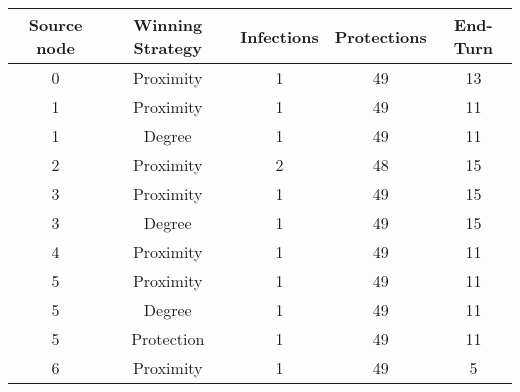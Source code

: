 \documentclass[results.tex]{subfiles}
\begin{document}
    \begin{center}
        \begin{tabular}{| c || c | c | c | c |}
            \hline
            {\bfseries Source node} & {\bfseries Winning Strategy} & {\bfseries Infections} & {\bfseries Protections}
            & {\bfseries End-Turn}
            \\  %
            \hline\hline
            0                       & Proximity                    & 1                      & 49                      & 13                   \\
            \hline
            1                       & Proximity                    & 1                      & 49                      & 11                   \\
            \hline
            1                       & Degree                       & 1                      & 49                      & 11                   \\
            \hline
            2                       & Proximity                    & 2                      & 48                      & 15                   \\
            \hline
            3                       & Proximity                    & 1                      & 49                      & 15                   \\
            \hline
            3                       & Degree                       & 1                      & 49                      & 15                   \\
            \hline
            4                       & Proximity                    & 1                      & 49                      & 11                   \\
            \hline
            5                       & Proximity                    & 1                      & 49                      & 11                   \\
            \hline
            5                       & Degree                       & 1                      & 49                      & 11                   \\
            \hline
            5                       & Protection                   & 1                      & 49                      & 11                   \\
            \hline
            6                       & Proximity                    & 1                      & 49                      & 5                    \\

\end{tabular}
\end{center}
\end{document}
